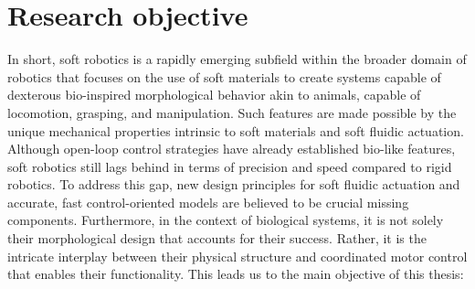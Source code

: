 \vspace{-3mm}
\section{Research objective}
In short, soft robotics is a rapidly emerging subfield within the broader domain of robotics that focuses on the use of soft materials to create systems capable of dexterous bio-inspired morphological behavior akin to animals, capable of locomotion, grasping, and manipulation. Such features are made possible by the unique mechanical properties intrinsic to soft materials and soft fluidic actuation. Although open-loop control strategies have already established bio-like features, soft robotics still lags behind in terms of precision and speed compared to rigid robotics. To address this gap, new design principles for soft fluidic actuation and accurate, fast control-oriented models are believed to be crucial missing components. Furthermore, in the context of biological systems, it is not solely their morphological design that accounts for their success. Rather, it is the intricate interplay between their physical structure and coordinated motor control that enables their functionality. This leads us to the main objective of this thesis: \\[0.15em]

